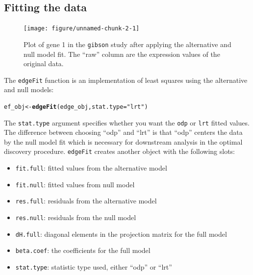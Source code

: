 \documentclass{article}\usepackage[]{graphicx}\usepackage[]{color}
\makeatletter
\newcommand{\hlstr}[1]{\textcolor[rgb]{0.192,0.494,0.8}{#1}}%
\newcommand{\hlstd}[1]{\textcolor[rgb]{0.345,0.345,0.345}{#1}}%
\newcommand{\hlkwb}[1]{\textcolor[rgb]{0.69,0.353,0.396}{#1}}%
\newcommand{\hlkwc}[1]{\textcolor[rgb]{0.333,0.667,0.333}{#1}}%
\newcommand{\hlkwd}[1]{\textcolor[rgb]{0.737,0.353,0.396}{\textbf{#1}}}%
\newenvironment{kframe}{%
 \def\at@end@of@kframe{}%
 \ifinner\ifhmode%
  \def\at@end@of@kframe{\end{minipage}}%
  \begin{minipage}{\columnwidth}%
 \fi\fi%
 \def\FrameCommand##1{\hskip\@totalleftmargin \hskip-\fboxsep
 \colorbox{shadecolor}{##1}\hskip-\fboxsep
     \hskip-\linewidth \hskip-\@totalleftmargin \hskip\columnwidth}%
 \MakeFramed {\advance\hsize-\width
   \@totalleftmargin\z@ \linewidth\hsize
   \@setminipage}}%
 {\par\unskip\endMakeFramed%
 \at@end@of@kframe}
\newenvironment{knitrout}{}{} %
\makeatother
\begin{document}
\subsection{Fitting the data}

\begin{figure}[t]
 \centering
\begin{knitrout}
\color{fgcolor}

{\centering \texttt{[image: figure/unnamed-chunk-2-1]} 

}



\end{knitrout}
\caption{Plot of gene 1 in the {\tt gibson} study after applying the alternative and null model fit. The ``raw'' column are the expression values of the original data.}
\label{fig:gplotFit}
\end{figure}

The {\tt edgeFit} function is an implementation of least squares using the alternative and null models:
\begin{knitrout}
\color{fgcolor}\begin{kframe}
\begin{alltt}
\hlstd{ef_obj} \hlkwb{<-} \hlkwd{edgeFit}\hlstd{(edge_obj,} \hlkwc{stat.type} \hlstd{=} \hlstr{"lrt"}\hlstd{)}
\end{alltt}
\end{kframe}
\end{knitrout}
The {\tt stat.type} argument specifies whether you want the {\tt odp} or {\tt lrt} fitted values. The difference between choosing ``odp'' and ``lrt'' is that ``odp'' centers the data by the null model fit which is necessary for downstream analysis in the optimal discovery procedure. {\tt edgeFit} creates another object with the following slots:
\begin{itemize}
\item {\tt fit.full}: fitted values from the alternative model
\item {\tt fit.null}: fitted values from null model
\item {\tt res.full}: residuals from the alternative model
\item {\tt res.null}: residuals from the null model
\item {\tt dH.full}: diagonal elements in the projection matrix for the full model
\item {\tt beta.coef}: the coefficients for the full model
\item {\tt stat.type}: statistic type used, either ``odp'' or ``lrt''
\end{itemize}
\end{document}
